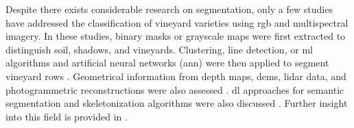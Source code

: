 Despite there exists considerable research on segmentation, only a few studies have addressed the classification of vineyard varieties using \acrshort{rgb} and multispectral imagery. In these studies, binary masks or grayscale maps were first extracted to distinguish soil, shadows, and vineyards. Clustering, line detection, or \acrshort{ml} algorithms and artificial neural networks (\acrshort{ann}) were then applied to segment vineyard rows \cite{fuentes-penailillo_using_2018, karatzinis_towards_2020, hajjar_vine_2021, padua_monitoring_2020, padua_vineyard_2022, poblete-echeverria_detection_2017}. Geometrical information from depth maps, \acrshort{dem}s, \acrshort{lidar} data, and photogrammetric reconstructions were also assessed \cite{kerkech_vine_2020, aguiar_localization_2022, jurado_automatic_2020}. \acrshort{dl} approaches for semantic segmentation and skeletonization algorithms were also discussed \cite{kerkech_vine_2020-1, barros_multispectral_2022, nolan_automated_2015}. Further insight into this field is provided in \cite{li_performance_2020}. 

